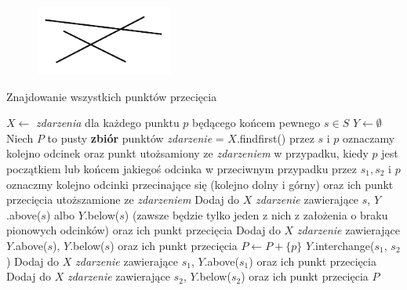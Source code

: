 \begin{figure}[H]
	\centering
	\includegraphics[width=0.4\textwidth]{data/zamiatanie_wariant2_kontrprzyklad.png}
	\caption{  }
	\label{fig:zamiatanie_kontrprzyklad_wariant2}
\end{figure}

\begin{algorithm}[H]
	\caption{Znajdowanie wszystkich punktów przecięcia}
	\begin{algorithmic}[1]
		\State $X \gets$ \textit{zdarzenia} dla każdego punktu $p$ będącego
		końcem pewnego $s \in S$
		\State $Y \gets \emptyset$
		\State Niech $P$ to pusty \textbf{zbiór} punktów
		\State \textit{zdarzenie} = $X.$findfirst()
		\State przez $s$ i $p$ oznaczamy
		kolejno odcinek oraz punkt utożsamiony ze \textit{zdarzeniem} w przypadku,
		kiedy $p$ jest początkiem lub końcem jakiegoś odcinka
		\State w przeciwnym przypadku przez $s_1, s_2$ i $p$ oznaczmy kolejno odcinki przecinające się (kolejno dolny i górny)
		oraz ich punkt przecięcia utoższamione ze \textit{zdarzeniem}
		\State Dodaj do $X$ \textit{zdarzenie} zawierające $s$, $Y$.above($s$)
		albo $Y$.below($s$) (zawsze będzie tylko jeden z nich z założenia o braku pionowych odcinków) oraz ich punkt przecięcia
		\EndIf
		\State Dodaj do $X$ \textit{zdarzenie} zawierające $Y$.above($s$), $Y$.below($s$) oraz ich punkt przecięcia  
		\EndIf
		\Else
		\State $P \gets P + \{p\}$
		\State $Y$.interchange($s_1$, $s_2$)
		\State Dodaj do $X$ \textit{zdarzenie} zawierające $s_1$, $Y$.above($s_1$) oraz ich punkt przecięcia
		\EndIf
		\State Dodaj do $X$ \textit{zdarzenie} zawierające $s_2$, $Y$.below($s_2$) oraz ich punkt przecięcia
		\EndIf
		\EndIf
		\EndWhile
		\State \Return $P$
		\EndProcedure
	\end{algorithmic}
	\label{HasIntersectingSegments2}
\end{algorithm}

